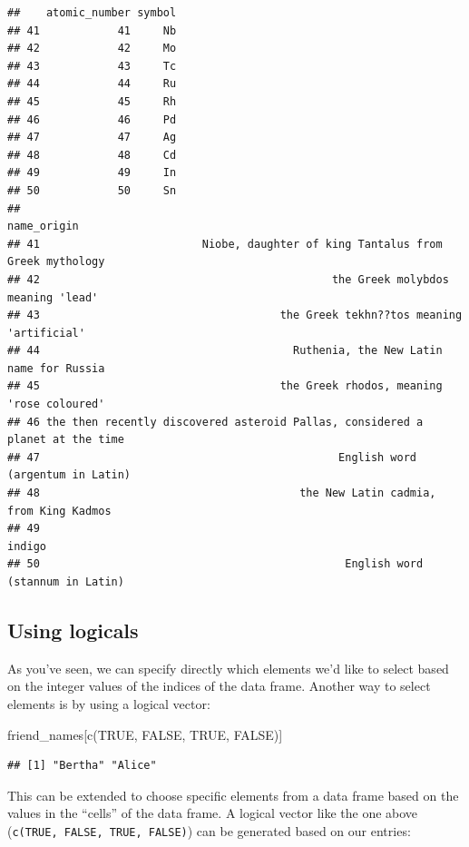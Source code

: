 \documentclass[]{tufte-book}
\newenvironment{Shaded}{\begin{snugshade}}{\end{snugshade}}
\newcommand{\ConstantTok}[1]{\textcolor[rgb]{0.00,0.00,0.00}{#1}}
\newcommand{\FunctionTok}[1]{\textcolor[rgb]{0.00,0.00,0.00}{#1}}
\newcommand{\NormalTok}[1]{#1}
\begin{document}
\begin{verbatim}
##    atomic_number symbol
## 41            41     Nb
## 42            42     Mo
## 43            43     Tc
## 44            44     Ru
## 45            45     Rh
## 46            46     Pd
## 47            47     Ag
## 48            48     Cd
## 49            49     In
## 50            50     Sn
##                                                                      name_origin
## 41                         Niobe, daughter of king Tantalus from Greek mythology
## 42                                             the Greek molybdos meaning 'lead'
## 43                                     the Greek tekhn??tos meaning 'artificial'
## 44                                       Ruthenia, the New Latin name for Russia
## 45                                     the Greek rhodos, meaning 'rose coloured'
## 46 the then recently discovered asteroid Pallas, considered a planet at the time
## 47                                              English word (argentum in Latin)
## 48                                        the New Latin cadmia, from King Kadmos
## 49                                                                        indigo
## 50                                               English word (stannum in Latin)
\end{verbatim}

\hypertarget{using-logicals}{%
\subsection{Using logicals}\label{using-logicals}}

As you've seen, we can specify directly which elements we'd like to select based on the integer values of the indices of the data frame. Another way to select elements is by using a logical vector:

\begin{Shaded}
\begin{Highlighting}[]
\NormalTok{friend\_names[}\FunctionTok{c}\NormalTok{(}\ConstantTok{TRUE}\NormalTok{, }\ConstantTok{FALSE}\NormalTok{, }\ConstantTok{TRUE}\NormalTok{, }\ConstantTok{FALSE}\NormalTok{)]}
\end{Highlighting}
\end{Shaded}

\begin{verbatim}
## [1] "Bertha" "Alice"
\end{verbatim}

This can be extended to choose specific elements from a data frame based on the values in the ``cells'' of the data frame. A logical vector like the one above (\texttt{c(TRUE,\ FALSE,\ TRUE,\ FALSE)}) can be generated based on our entries:
\end{document}

